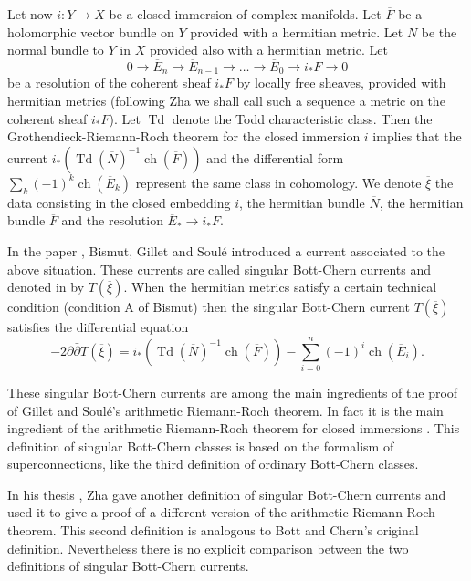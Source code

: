 \documentclass[10pt,twoside]{article}
\numberwithin{equation}{section}
\theoremstyle{plain}
\theoremstyle{definition}
\DeclareMathOperator{\Td}{Td}
\DeclareMathOperator{\ch}{ch}
\begin{document}
Let now $i\colon Y\longrightarrow X$ be a closed immersion of complex
manifolds. Let $\overline {F}$ be a holomorphic vector bundle on $Y$
provided with a hermitian metric. Let $\overline N$ be the normal
bundle to $Y$ in $X$ provided also with a hermitian metric. Let
\begin{displaymath}
 0\longrightarrow \overline E_{n}\longrightarrow
 \overline E_{n-1}
  \longrightarrow \dots \longrightarrow \overline E_{0}
  \longrightarrow i_{\ast} F\longrightarrow 0
\end{displaymath}
be a resolution of the coherent sheaf $i_{\ast} F$ by locally free
sheaves, provided with hermitian metrics (following Zha
\cite{zha99:_rieman_roch} we shall call such a
sequence a metric on the coherent sheaf $i_{\ast} F$). Let $\Td$
denote the Todd characteristic class. Then the
Grothendieck-Riemann-Roch theorem for the closed immersion $i$
implies that the current $i_{\ast}(\Td(\overline
N)^{-1}\ch(\overline F))$ and the differential form
$\sum_{k}(-1)^{k}\ch(\overline E_{k})$ represent the same class in
cohomology. We denote $\overline {\xi}$ the data consisting in the
closed embedding $i$, the hermitian bundle $\overline N$, the
hermitian bundle $\overline {F}$ and the resolution $\overline
E_{\ast} \longrightarrow i_{\ast} F$.

In the paper \cite{BismutGilletSoule:MR1047123}, Bismut, Gillet and
Soul\'e introduced a current associated to the above
situation. These currents are called singular Bott-Chern currents
and denoted in \cite{BismutGilletSoule:MR1047123} by
$T(\overline \xi)$. When the hermitian metrics satisfy a
certain technical condition (condition A of Bismut) then the
singular Bott-Chern current $T(\overline \xi)$ satisfies the
differential equation
\begin{displaymath}
  -2\partial\bar \partial T(\overline \xi)=
  i_{\ast}(\Td(\overline N)^{-1}\ch(\overline F))
  -\sum_{i=0}^{n}(-1)^{i}\ch(\overline E_{i}).
\end{displaymath}

These singular Bott-Chern currents are among the main ingredients
of the proof of Gillet and
Soul\'e's arithmetic Riemann-Roch theorem. In fact it is the main
ingredient of the arithmetic 
Riemann-Roch theorem for closed immersions
\cite{BismutGilletSoule:MR1086887}. This definition of singular
Bott-Chern classes is based on the formalism of superconnections,
like the third definition of ordinary Bott-Chern classes.

In his thesis \cite{zha99:_rieman_roch}, Zha gave another
definition of singular Bott-Chern currents and used it to give a
proof of a different version of the arithmetic Riemann-Roch theorem.
This second definition is analogous to Bott and Chern's original
definition. Nevertheless there is no explicit comparison between 
the two definitions of singular Bott-Chern currents.
\end{document}
